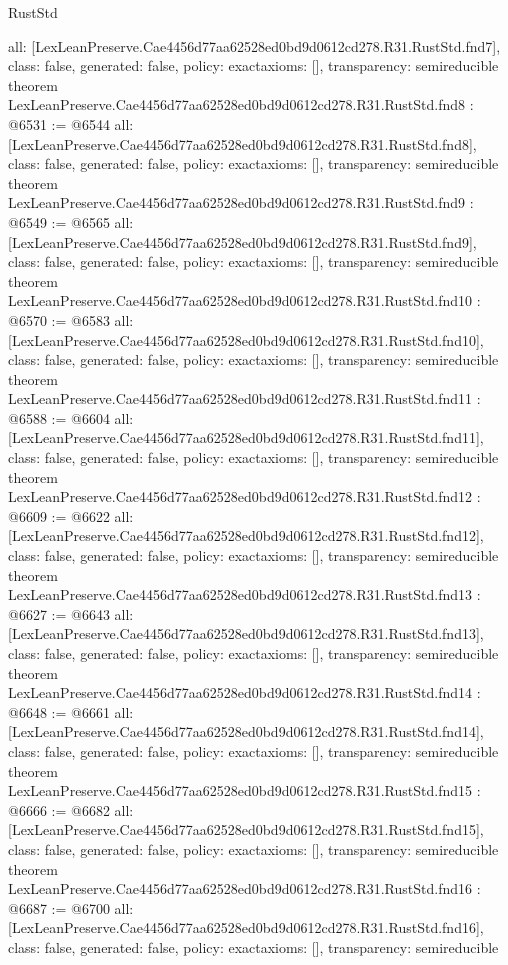 \begin{lexlean}{RustStd}
\begin{coremodule}
{  all: [LexLeanPreserve.Cae4456d77aa62528ed0bd9d0612cd278.R31.RustStd.fnd7],
  class: false,
  generated: false,
  policy: exact{axioms: []},
  transparency: semireducible
}
theorem LexLeanPreserve.Cae4456d77aa62528ed0bd9d0612cd278.R31.RustStd.fnd8 : @6531 := @6544 {
  all: [LexLeanPreserve.Cae4456d77aa62528ed0bd9d0612cd278.R31.RustStd.fnd8],
  class: false,
  generated: false,
  policy: exact{axioms: []},
  transparency: semireducible
}
theorem LexLeanPreserve.Cae4456d77aa62528ed0bd9d0612cd278.R31.RustStd.fnd9 : @6549 := @6565 {
  all: [LexLeanPreserve.Cae4456d77aa62528ed0bd9d0612cd278.R31.RustStd.fnd9],
  class: false,
  generated: false,
  policy: exact{axioms: []},
  transparency: semireducible
}
theorem LexLeanPreserve.Cae4456d77aa62528ed0bd9d0612cd278.R31.RustStd.fnd10 : @6570 := @6583 {
  all: [LexLeanPreserve.Cae4456d77aa62528ed0bd9d0612cd278.R31.RustStd.fnd10],
  class: false,
  generated: false,
  policy: exact{axioms: []},
  transparency: semireducible
}
theorem LexLeanPreserve.Cae4456d77aa62528ed0bd9d0612cd278.R31.RustStd.fnd11 : @6588 := @6604 {
  all: [LexLeanPreserve.Cae4456d77aa62528ed0bd9d0612cd278.R31.RustStd.fnd11],
  class: false,
  generated: false,
  policy: exact{axioms: []},
  transparency: semireducible
}
theorem LexLeanPreserve.Cae4456d77aa62528ed0bd9d0612cd278.R31.RustStd.fnd12 : @6609 := @6622 {
  all: [LexLeanPreserve.Cae4456d77aa62528ed0bd9d0612cd278.R31.RustStd.fnd12],
  class: false,
  generated: false,
  policy: exact{axioms: []},
  transparency: semireducible
}
theorem LexLeanPreserve.Cae4456d77aa62528ed0bd9d0612cd278.R31.RustStd.fnd13 : @6627 := @6643 {
  all: [LexLeanPreserve.Cae4456d77aa62528ed0bd9d0612cd278.R31.RustStd.fnd13],
  class: false,
  generated: false,
  policy: exact{axioms: []},
  transparency: semireducible
}
theorem LexLeanPreserve.Cae4456d77aa62528ed0bd9d0612cd278.R31.RustStd.fnd14 : @6648 := @6661 {
  all: [LexLeanPreserve.Cae4456d77aa62528ed0bd9d0612cd278.R31.RustStd.fnd14],
  class: false,
  generated: false,
  policy: exact{axioms: []},
  transparency: semireducible
}
theorem LexLeanPreserve.Cae4456d77aa62528ed0bd9d0612cd278.R31.RustStd.fnd15 : @6666 := @6682 {
  all: [LexLeanPreserve.Cae4456d77aa62528ed0bd9d0612cd278.R31.RustStd.fnd15],
  class: false,
  generated: false,
  policy: exact{axioms: []},
  transparency: semireducible
}
theorem LexLeanPreserve.Cae4456d77aa62528ed0bd9d0612cd278.R31.RustStd.fnd16 : @6687 := @6700 {
  all: [LexLeanPreserve.Cae4456d77aa62528ed0bd9d0612cd278.R31.RustStd.fnd16],
  class: false,
  generated: false,
  policy: exact{axioms: []},
  transparency: semireducible
}

\end{coremodule}
\end{lexlean}

